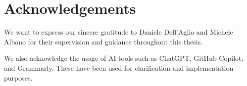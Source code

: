 

\section{Acknowledgements}\label{sec:acknowledgements}
We want to express our sincere gratitude to Daniele Dell'Aglio and Michele Albano for their supervision and guidance throughout this thesis.

We also acknowledge the usage of AI tools such as ChatGPT, GitHub Copilot, and Grammarly.
These have been used for clarification and implementation purposes.